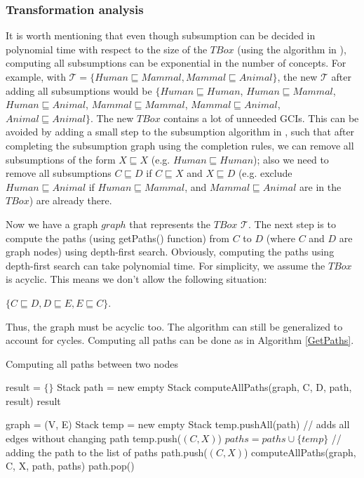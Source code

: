 \subsubsection{Transformation analysis}
It is worth mentioning that even though subsumption can be decided in polynomial time with respect to the size of the $TBox$ (using the algorithm in \cite{small}), computing all subsumptions can be exponential in the number of concepts. For example, with $\mathcal{T} = \{Human \sqsubseteq Mammal, Mammal \sqsubseteq Animal\}$, the new $\mathcal{T}$ after adding all subsumptions would be $\{Human \sqsubseteq Human$, $Human \sqsubseteq Mammal$, $Human \sqsubseteq Animal$, $Mammal \sqsubseteq Mammal$, $Mammal \sqsubseteq Animal$, $Animal \sqsubseteq Animal\}$. The new $TBox$ contains a lot of unneeded GCIs. This can be avoided by adding a small step to the subsumption algorithm in \cite{small}, such that after completing the subsumption graph using the completion rules, we can remove all subsumptions of the form $X \sqsubseteq X$ (e.g. $Human \sqsubseteq Human$); also we need to remove all subsumptions $C \sqsubseteq D$ if $C \sqsubseteq X$ and $X \sqsubseteq D$ (e.g. exclude $Human \sqsubseteq Animal$ if $Human \sqsubseteq Mammal$, and $Mammal \sqsubseteq Animal$ are in the $TBox$) are already there.

Now we have a graph $graph$ that represents the $TBox$ $\mathcal{T}$. The next step is to compute the paths (using getPaths() function) from $C$ to $D$ (where $C$ and $D$ are graph nodes) using depth-first search. Obviously, computing the paths using depth-first search can take polynomial time. For simplicity, we assume the $TBox$ is acyclic. This means we don't allow the following situation:
\begin{center}
$\lbrace C \sqsubseteq D , D \sqsubseteq E , E \sqsubseteq C \rbrace$.
\end{center}
Thus, the graph must be acyclic too. The algorithm can still be generalized to account for cycles. Computing all paths can be done as in Algorithm \ref{GetPaths}.

\begin{algorithm}
\caption{Computing all paths between two nodes}
\label{GetPaths}
\begin{algorithmic}[1]
\State result = $\{\}$
\State Stack path = new empty Stack
\State computeAllPaths(graph, C, D, path, result)
\State \Return result
\EndFunction
\end{algorithmic}

\begin{algorithmic}[1]
\State graph = (V, E)
\State Stack temp = new empty Stack
\State temp.pushAll(path)  // adds all edges without changing path
\State temp.push($(C, X)$)
\State $paths = paths \cup \{temp\}$  // adding the path to the list of paths
\Else
\State path.push($(C, X)$)
\State computeAllPaths(graph, C, X, path, paths)
\State path.pop()
\EndIf
\EndFor
\EndFunction
\end{algorithmic}
\end{algorithm}

